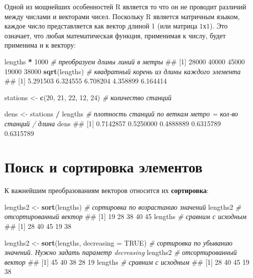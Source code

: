 \documentclass[]{book}
\newenvironment{Shaded}{\begin{snugshade}}{\end{snugshade}}
\newcommand{\KeywordTok}[1]{\textcolor[rgb]{0.13,0.29,0.53}{\textbf{#1}}}
\newcommand{\DataTypeTok}[1]{\textcolor[rgb]{0.13,0.29,0.53}{#1}}
\newcommand{\DecValTok}[1]{\textcolor[rgb]{0.00,0.00,0.81}{#1}}
\newcommand{\StringTok}[1]{\textcolor[rgb]{0.31,0.60,0.02}{#1}}
\newcommand{\CommentTok}[1]{\textcolor[rgb]{0.56,0.35,0.01}{\textit{#1}}}
\newcommand{\OtherTok}[1]{\textcolor[rgb]{0.56,0.35,0.01}{#1}}
\newcommand{\OperatorTok}[1]{\textcolor[rgb]{0.81,0.36,0.00}{\textbf{#1}}}
\newcommand{\NormalTok}[1]{#1}
\begin{document}
Одной из мощнейших особенностей R является то что он не проводит
различий между числами и векторами чисел. Поскольку R является матричным
языком, каждое число представляется как вектор длиной 1 (или матрица
\(1х1\)). Это означает, что любая математическая функция, применимая к
числу, будет применима и к вектору:

\begin{Shaded}
\begin{Highlighting}[]
\NormalTok{lengths }\OperatorTok{*}\StringTok{ }\DecValTok{1000} \CommentTok{# преобразуем длины линий в метры}
\NormalTok{## [1] 28000 40000 45000 19000 38000}
\KeywordTok{sqrt}\NormalTok{(lengths) }\CommentTok{# квадратный корень из длины каждого элемента}
\NormalTok{## [1] 5.291503 6.324555 6.708204 4.358899 6.164414}

\NormalTok{stations <-}\StringTok{ }\KeywordTok{c}\NormalTok{(}\DecValTok{20}\NormalTok{, }\DecValTok{21}\NormalTok{, }\DecValTok{22}\NormalTok{, }\DecValTok{12}\NormalTok{, }\DecValTok{24}\NormalTok{) }\CommentTok{# количество станций}

\NormalTok{dens <-}\StringTok{ }\NormalTok{stations }\OperatorTok{/}\StringTok{ }\NormalTok{lengths }\CommentTok{# плотность станций по веткам метро = кол-во станций / длина }
\NormalTok{dens}
\NormalTok{## [1] 0.7142857 0.5250000 0.4888889 0.6315789 0.6315789}
\end{Highlighting}
\end{Shaded}

\section{Поиск и сортировка элементов}\label{vector_search_sorting}

К важнейшим преобразованиям векторов относится их \textbf{сортировка}:

\begin{Shaded}
\begin{Highlighting}[]
\NormalTok{lengths2 <-}\StringTok{ }\KeywordTok{sort}\NormalTok{(lengths) }\CommentTok{# сортировка по возрастанию значений}
\NormalTok{lengths2 }\CommentTok{# отсортированный вектор}
\NormalTok{## [1] 19 28 38 40 45}
\NormalTok{lengths }\CommentTok{# сравним с исходным}
\NormalTok{## [1] 28 40 45 19 38}

\NormalTok{lengths2 <-}\StringTok{ }\KeywordTok{sort}\NormalTok{(lengths, }\DataTypeTok{decreasing =} \OtherTok{TRUE}\NormalTok{) }\CommentTok{# сортировка по убыванию значений. Нужно задать параметр decreasing}
\NormalTok{lengths2 }\CommentTok{# отсортированный вектор}
\NormalTok{## [1] 45 40 38 28 19}
\NormalTok{lengths }\CommentTok{# сравним с исходным}
\NormalTok{## [1] 28 40 45 19 38}
\end{Highlighting}
\end{Shaded}
\end{document}
